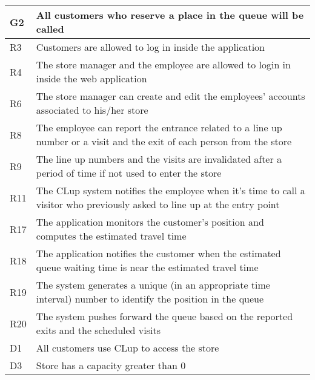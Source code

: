 \begin{center}
    {\renewcommand{\arraystretch}{1.5}
    \begin{longtable}{L{2cm}L{12cm}}
        \hline
        \textbf{G2} & \textbf{All customers who reserve a place in the queue will be called} \\
        \hline
         R3 & Customers are allowed to log in inside the application \\
        \hline
         R4 & The store manager and the employee are allowed to login in inside the web application \\
        \hline
         R6 & The store manager can create and edit the employees’ accounts associated to his/her store \\
        \hline
         R8 & The employee can report the entrance related to a line up number or a visit and the exit of each person from the store \\
        \hline
         R9 & The line up numbers and the visits are invalidated after a period of time if not used to enter the store \\
        \hline
         R11 & The CLup system notifies the employee when it’s time to call a visitor who previously asked to line up at the entry point \\
        \hline
         R17 & The application monitors the customer’s position and computes the estimated travel time \\
        \hline
         R18 & The application notifies the customer when the estimated queue waiting time is near the estimated travel time \\
        \hline
         R19 & The system generates a unique (in an appropriate time interval) number to identify the position in the queue \\
        \hline
         R20 & The system pushes forward the queue based on the reported exits and the scheduled visits \\
        \hline
         D1 & All customers use CLup to access the store \\
        \hline
         D3 & Store has a capacity greater than 0 \\

\end{longtable}}
\end{center}
